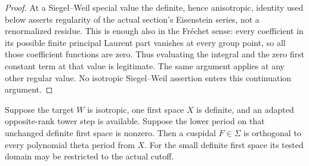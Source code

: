 \begin{proof}
At a Siegel--Weil special value the definite, hence anisotropic,
identity used below asserts regularity of the actual section's
Eisenstein series, not a renormalized residue. This is enough
also in the Fr\'echet sense: every coefficient in its possible
finite principal Laurent part vanishes at every group point,
so all those coefficient functions are zero.
Thus evaluating the integral and the zero first constant term
at that value is legitimate. The same argument applies at
any other regular value. No isotropic Siegel--Weil assertion
enters this continuation argument.
\end{proof}

\begin{srproposition}
\label{prop:sr-theta-orthogonal-definite}
Suppose the target \(W\) is isotropic, one first space \(X\)
is definite, and an adapted opposite-rank tower step is available.
Suppose the lower period on that unchanged definite first space
is nonzero. Then a cuspidal \(F\in\Sigma\) is orthogonal to every
polynomial theta period from \(X\).
For the small definite first space its tested domain may be
restricted to the actual cutoff.
\end{srproposition}

